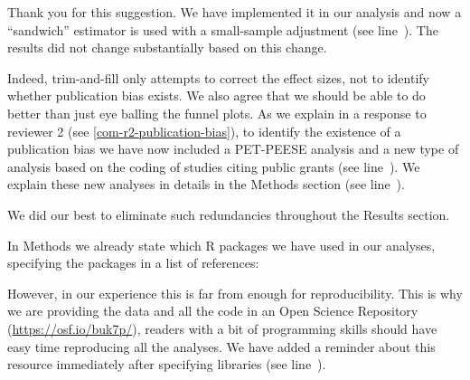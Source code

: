 Thank you for this suggestion. We have implemented it in our analysis and now a ``sandwich'' estimator is used with a small-sample adjustment \citep{hedges2010} (see line~). The results did not change substantially based on this change.



Indeed, trim-and-fill only attempts to correct the effect sizes, not to identify whether publication bias exists. We also agree that we should be able to do better than just eye balling the funnel plots. As we explain in a response to reviewer 2 (see \ref{com-r2-publication-bias}), to identify the existence of a publication bias we have now included a PET-PEESE analysis and a new type of analysis based on the coding of studies citing public grants (see line~). We explain these new analyses in details in the Methods section (see line~). 



We did our best to eliminate such redundancies throughout the Results section.



In Methods we already state which R packages we have used in our analyses, specifying the packages in a list of references:


However, in our experience this is far from enough for reproducibility. This is why we are providing the data and all the code in an Open Science Repository (\url{https://osf.io/buk7p/}), readers with a bit of programming skills should have easy time reproducing all the analyses. We have added a reminder about this resource immediately after specifying libraries (see line~). 


